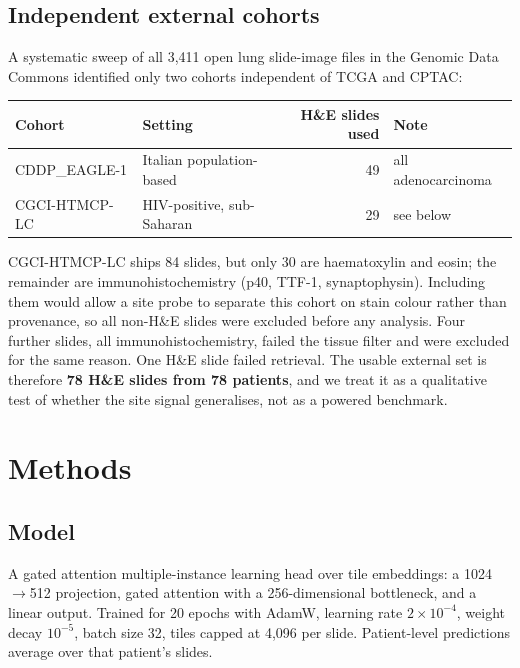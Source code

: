 \documentclass[11pt,a4paper]{article}
\begin{document}
\subsection{Independent external cohorts}

A systematic sweep of all 3{,}411 open lung slide-image files in the Genomic Data Commons
identified only two cohorts independent of TCGA and CPTAC:

\begin{center}
\begin{tabular}{@{}llrl@{}}
\toprule
\textbf{Cohort} & \textbf{Setting} & \textbf{H\&E slides used} & \textbf{Note} \\
\midrule
CDDP\_EAGLE-1 & Italian population-based & 49 & all adenocarcinoma \\
CGCI-HTMCP-LC & HIV-positive, sub-Saharan & 29 & see below \\
\bottomrule
\end{tabular}
\end{center}

CGCI-HTMCP-LC ships 84 slides, but only 30 are haematoxylin and eosin; the remainder are
immunohistochemistry (p40, TTF-1, synaptophysin). Including them would allow a site probe to
separate this cohort on stain colour rather than provenance, so all non-H\&E slides were
excluded before any analysis. Four further slides, all immunohistochemistry, failed the tissue
filter and were excluded for the same reason. One H\&E slide failed retrieval. The usable
external set is therefore \textbf{78 H\&E slides from 78 patients}, and we treat it as a
qualitative test of whether the site signal generalises, not as a powered benchmark.

\section{Methods}

\subsection{Model}

A gated attention multiple-instance learning head over tile embeddings: a 1024$\rightarrow$512
projection, gated attention with a 256-dimensional bottleneck, and a linear output. Trained for
20 epochs with AdamW, learning rate $2\times10^{-4}$, weight decay $10^{-5}$, batch size 32,
tiles capped at 4{,}096 per slide. Patient-level predictions average over that patient's slides.
\end{document}
